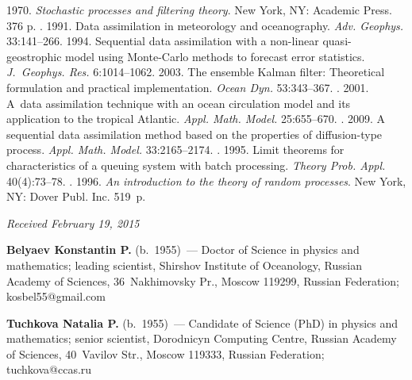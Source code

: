   \begin{multicols}{2}

\renewcommand{\bibname}{\protect\rmfamily References}



{\small\frenchspacing
 {%
 \begin{thebibliography}{9}
 1970. \textit{Stochastic processes and filtering theory}. New York, NY: Academic Press. 376 p.
. 1991. Data assimilation in meteorology and oceanography. \textit{Adv. Geophys.} 33:141--266.
 1994. Sequential data assimilation with a non-linear quasi-geostrophic model using Monte-Carlo methods to forecast error statistics.
\textit{J.~Geophys. Res.} 6:1014--1062.
 2003. The ensemble Kalman filter: Theoretical
formulation and practical implementation. \textit{Ocean Dyn.} 53:343--367.
. 2001.
A~data assimilation technique with an ocean circulation model
and its application to the tropical Atlantic. \textit{Appl. Math. Model.} 25:655--670.
. 2009. A sequential data assimilation method based on the properties of diffusion-type process. \textit{Appl. Math. Model.} 33:2165--2174.
. 1995. Limit theorems for characteristics of a queuing system with batch processing. \textit{Theory Prob. Appl.} 40(4):73--78.
. 1996.  \textit{An introduction to the theory of random processes}. New York, NY: Dover Publ. Inc. 519~p.
\end{thebibliography}

 }
 }

\end{multicols}

\vspace*{-3pt}

\hfill{\small\textit{Received February 19, 2015}}


\Contr

\noindent
\textbf{Belyaev Konstantin P.} (b.\ 1955)~--- Doctor of Science in physics
and mathematics; leading scientist, Shirshov Institute of Oceanology,
Russian Academy of Sciences, 36~Nakhimovsky Pr., Moscow 119299, Russian Federation;
kosbel55@gmail.com

\vspace*{3pt}

\noindent
\textbf{Tuchkova Natalia P.} (b.\ 1955)~--- Candidate of Science (PhD)
in physics and mathematics; senior scientist, Dorodnicyn Computing Centre,
Russian Academy of Sciences, 40~Vavilov Str., Moscow 119333, Russian Federation;
tuchkova@ccas.ru


\label{end\stat}


\renewcommand{\bibname}{\protect\rm Литература} 